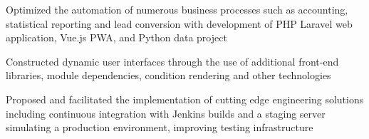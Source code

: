 \documentclass[letterpaper]{deedy-resume} %
\begin{document}
\begin{minipage}[t]{0.66\textwidth}
\begin{tightitemize}
\end{tightitemize}
\sectionspace

\vspace{5pt}

\begin{tightitemize}

\item Optimized the automation of numerous business processes such as accounting,
statistical reporting and lead conversion with development of PHP Laravel web
application, Vue.js PWA, and Python data project

\item Constructed dynamic user interfaces through the use of additional front-end libraries, module dependencies, condition rendering and other technologies

\item Proposed and facilitated the implementation of cutting edge engineering
solutions including continuous integration with Jenkins builds and a staging
server simulating a production environment, improving testing infrastructure


\end{tightitemize}
\sectionspace



\end{minipage}
\end{document}
